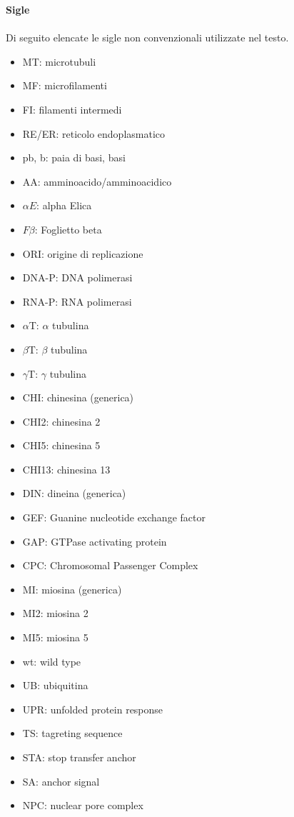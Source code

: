 \Large\textbf{Sigle}\\
\small \\
Di seguito elencate le sigle non convenzionali utilizzate nel testo.

\small
\begin{itemize}
    \item MT: microtubuli
    \item MF: microfilamenti
    \item FI: filamenti intermedi
    \item RE/ER: reticolo endoplasmatico
    \item pb, b: paia di basi, basi
    \item AA: amminoacido/amminoacidico
    \item $\alpha E$: alpha Elica
    \item $F\beta$: Foglietto beta
    \item ORI: origine di replicazione
    \item DNA-P: DNA polimerasi
    \item RNA-P: RNA polimerasi
    \item $\alpha$T: $\alpha$ tubulina
    \item $\beta$T: $\beta$ tubulina
    \item $\gamma$T: $\gamma$ tubulina
    \item CHI: chinesina (generica)
    \item CHI2: chinesina 2
    \item CHI5: chinesina 5
    \item CHI13: chinesina 13
    \item DIN: dineina (generica)
    \item GEF: Guanine nucleotide exchange factor
    \item GAP: GTPase activating protein
    \item CPC: Chromosomal Passenger Complex
    \item MI: miosina (generica)
    \item MI2: miosina 2
    \item MI5: miosina 5
    \item wt: wild type
    \item UB: ubiquitina
    \item UPR: unfolded protein response
    \item TS: tagreting sequence
    \item STA: stop transfer anchor
    \item SA: anchor signal
    \item NPC: nuclear pore complex

\end{itemize}
